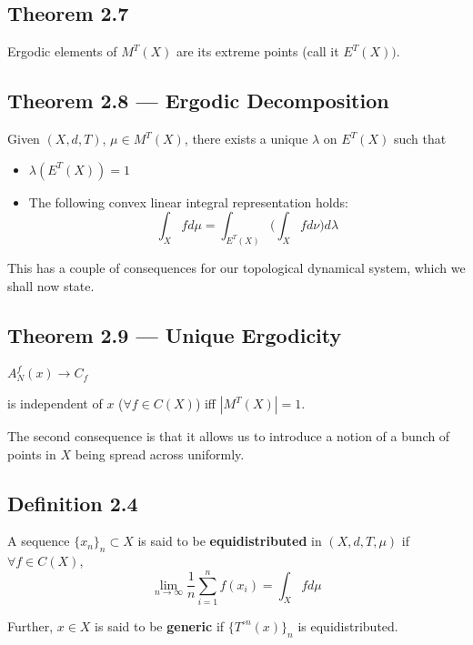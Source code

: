 \documentclass[11pt,a4paper]{article}
\begin{document}
\subsection*{Theorem 2.7}
    Ergodic elements of $M^T(X)$ are its extreme points (call it $E^T(X))$.

\subsection*{Theorem 2.8 — Ergodic Decomposition} Given $(X, d, T)$, $\mu\in M^T(X)$, there exists a unique $\lambda$ on $E^T(X)$ such that
\begin{itemize}
    \item $\lambda(E^T(X)) = 1$
    \item The following convex linear integral representation holds:
    $$\int_Xfd\mu = \int_{E^T(X)}\bigg(\int_Xfd\nu\bigg)d\lambda$$
\end{itemize}

This has a couple of consequences for our topological dynamical system, which
we shall now state.
\subsection*{Theorem 2.9 — Unique Ergodicity}
$A_N^f(x) \rightarrow C_f$

is independent of $x$ ($\forall f \in C(X)$) iff $|M^T(X)| =1$.

The second consequence is that it allows us to introduce a notion of a bunch
of points in $X$ being spread across uniformly.
\subsection*{Definition 2.4}
A sequence $\{x_n\}_n \subset X$ is said to be \textbf{equidistributed} in $(X, d, T, \mu)$ if $\forall f\in C(X)$,
$$\lim_{n\rightarrow \infty} \frac{1}{n}\sum_{i=1}^{n}f(x_i) = \int_Xfd\mu$$

Further, $x\in X$ is said to be \textbf{generic} if $\{T^{\circ n}(x)\}_n$ is equidistributed.

\end{document}
